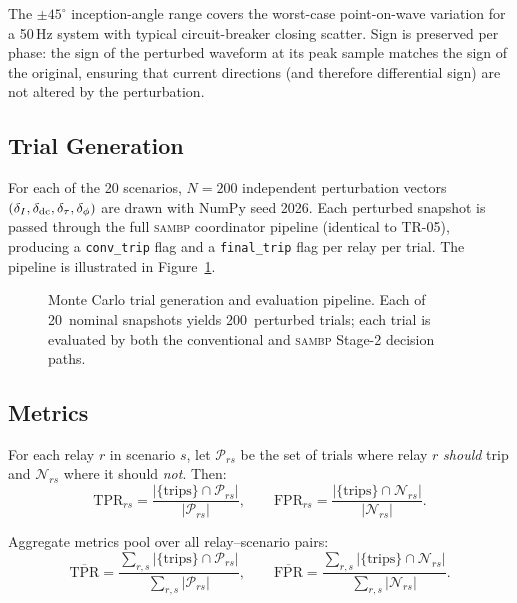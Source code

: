 \documentclass[12pt,a4paper]{article}
\newcommand{\SAMBP}{\textsc{sambp}}
\begin{document}
The $\pm45^\circ$ inception-angle range covers the worst-case
point-on-wave variation for a 50\,Hz system with typical circuit-breaker
closing scatter.  Sign is preserved per phase: the sign of the
perturbed waveform at its peak sample matches the sign of the original,
ensuring that current directions (and therefore differential sign) are
not altered by the perturbation.

\subsection{Trial Generation}

For each of the 20 scenarios, $N = 200$ independent perturbation
vectors $(\delta_I, \delta_{\rm dc}, \delta_\tau, \delta_\phi)$ are
drawn with NumPy seed 2026.  Each perturbed snapshot is passed through
the full \SAMBP{} coordinator pipeline (identical to TR-05), producing
a \texttt{conv\_trip} flag and a \texttt{final\_trip} flag per relay
per trial.  The pipeline is illustrated in
Figure~\ref{fig:mc_methodology}.

\begin{figure}[ht]
  \centering
  
  \caption{Monte Carlo trial generation and evaluation pipeline.
    Each of 20~nominal snapshots yields 200~perturbed trials;
    each trial is evaluated by both the conventional and \SAMBP{}
    Stage-2 decision paths.}
  \label{fig:mc_methodology}
\end{figure}

\subsection{Metrics}

For each relay $r$ in scenario $s$, let $\mathcal{P}_{rs}$ be the set
of trials where relay $r$ \emph{should} trip and $\mathcal{N}_{rs}$
where it should \emph{not}.  Then:
\begin{equation}
  \mathrm{TPR}_{rs} = \frac{|\{\text{trips}\}\cap\mathcal{P}_{rs}|}{|\mathcal{P}_{rs}|},
  \qquad
  \mathrm{FPR}_{rs} = \frac{|\{\text{trips}\}\cap\mathcal{N}_{rs}|}{|\mathcal{N}_{rs}|}.
\end{equation}

Aggregate metrics pool over all relay--scenario pairs:
\begin{equation}
  \overline{\mathrm{TPR}} =
    \frac{\sum_{r,s}|\{\text{trips}\}\cap\mathcal{P}_{rs}|}{\sum_{r,s}|\mathcal{P}_{rs}|},
  \qquad
  \overline{\mathrm{FPR}} =
    \frac{\sum_{r,s}|\{\text{trips}\}\cap\mathcal{N}_{rs}|}{\sum_{r,s}|\mathcal{N}_{rs}|}.
\end{equation}
\end{document}
